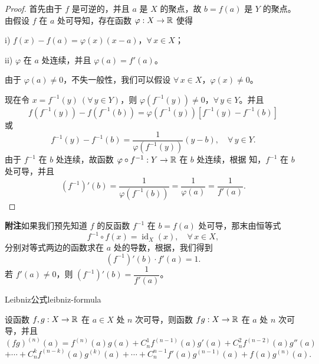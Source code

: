 \begin{proof}

	首先由于 \(f\) 是可逆的，并且 \(a\) 是 \(X\) 的聚点，故 \(b=f(a)\) 是 \(Y\) 的聚点。由假设 \(f\) 在 \(a\) 处可导知，存在函数 \(\varphi:X\to\mathbb{R}\) 使得

	i) \(f(x)-f(a)=\varphi(x)(x-a)\)，\(\forall\,x\in X\)；

	ii) \(\varphi\) 在 \(a\) 处连续，并且 \(\varphi(a)=f'(a)\)。

	由于 \(\varphi(a)\neq0\)，不失一般性，我们可以假设 \(\forall\,x\in X\)，\(\varphi(x)\neq0\)。

	现在令 \(x=f^{-1}(y)\ (\forall\,y\in Y)\)，则 \(\varphi(f^{-1}(y))\neq0\)，\(\forall\,y\in Y\)。并且
	\[
	f(f^{-1}(y))-f(f^{-1}(b))=\varphi(f^{-1}(y))[f^{-1}(y)-f^{-1}(b)]
	\]
	或
	\[
	f^{-1}(y)-f^{-1}(b)=\frac1{\varphi(f^{-1}(y))}(y-b),\quad\forall\,y\in Y.
	\]
	由于 \(f^{-1}\) 在 \(b\) 处连续，故函数 \(\varphi\circ f^{-1}:Y\to\mathbb{R}\) 在 \(b\) 处连续，根据 知，\(f^{-1}\) 在 \(b\) 处可导，并且
	\[
	(f^{-1})'(b)=\frac1{\varphi(f^{-1}(b))}=\frac1{\varphi(a)}=\frac1{f'(a)}.
	\]

\end{proof}

\textbf{附注}\quad 如果我们预先知道 \(f\) 的反函数 \(f^{-1}\) 在 \(b=f(a)\) 处可导，那末由恒等式
\[
f^{-1}\circ f(x)=\operatorname{id}_X(x),\quad\forall\,x\in X,
\]
分别对等式两边的函数求在 \(a\) 处的导数，根据，我们得到
\[
(f^{-1})'(b)\cdot f'(a)=1.
\]
若 \(f'(a)\neq0\)，则 \((f^{-1})'(b)=\dfrac1{f'(a)}\)。

\begin{mythm}{Leibniz公式}{leibniz-formula}

	设函数 \(f,g:X\to\mathbb{R}\) 在 \(a\in X\) 处 \(n\) 次可导，则函数 \(fg:X\to\mathbb{R}\) 在 \(a\) 处 \(n\) 次可导，并且
	\[
	(fg)^{(n)}(a)=f^{(n)}(a)g(a)+C_n^1f^{(n-1)}(a)g'(a)+C_n^2f^{(n-2)}(a)g''(a)
	\]
	\[
	+\cdots+C_n^kf^{(n-k)}(a)g^{(k)}(a)+\cdots+C_n^{n-1}f'(a)g^{(n-1)}(a)+f(a)g^{(n)}(a).
	\]

\end{mythm}

